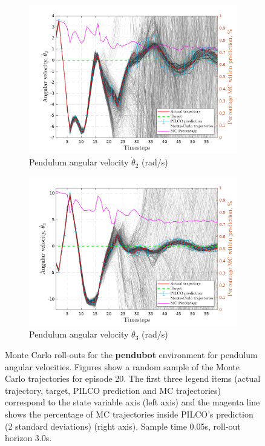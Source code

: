  \begin{figure}[htbp]    
    \begin{subfigure}[b]{1\linewidth}
    \centering
    \includegraphics[height=0.4\textheight,width=1\textwidth]{Chapter3/Figures/pen_MC_rollout_Ep_40_Dim_1.png} 
    \caption{Pendulum angular velocity $\dot \theta_{2}$ (rad/s)} 
    \label{Fig:Re-pen-cart-position} 
  \end{subfigure} 
  \hspace{\fill}  %
  \begin{subfigure}[b]{1\linewidth}
    \centering
    \includegraphics[height=0.4\textheight,width=1\textwidth]{Chapter3/Figures/pen_MC_rollout_Ep_40_Dim_2.png} 
    \caption{Pendulum angular velocity $\dot \theta_{3}$ (rad/s)} 
    \label{Fig:Re-pen-cart-velocity} 
  \end{subfigure} 
\caption[Monte Carlo roll-outs for \textbf{pendubot} pendulum angular velocities]{Monte Carlo roll-outs for the \textbf{pendubot} environment for pendulum angular velocities. Figures show a random sample of the Monte Carlo trajectories for episode 20. The first three legend items (actual trajectory, target, PILCO prediction and MC trajectories) correspond to the state variable axis (left axis) and the magenta line shows the percentage of MC trajectories inside PILCO's prediction (2 standard deviations) (right axis). Sample time 0.05s, roll-out horizon 3.0s.}
\label{Fig:Re-pen-MC-roll-outs-1} 
\end{figure}
 
